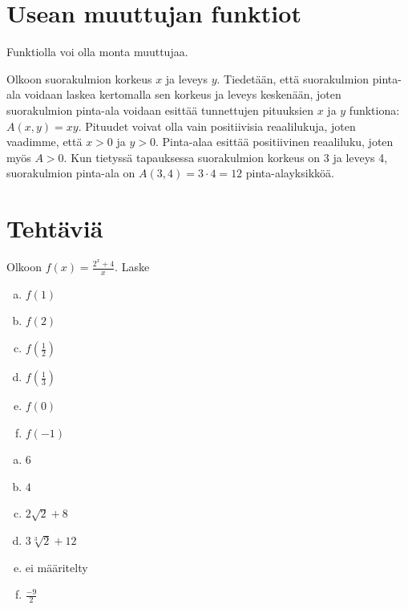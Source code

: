 \section{Usean muuttujan funktiot}

Funktiolla voi olla monta muuttujaa. 


\begin{esimerkki}
Olkoon suorakulmion korkeus $x$ ja leveys $y$. Tiedetään, että suorakulmion pinta-ala voidaan laskea kertomalla sen korkeus ja leveys keskenään, joten suorakulmion pinta-ala voidaan esittää tunnettujen pituuksien $x$ ja $y$ funktiona: $A(x,y)=xy$. Pituudet voivat olla vain positiivisia reaalilukuja, joten vaadimme, että $x>0$ ja $y>0$. Pinta-alaa esittää positiivinen reaaliluku, joten myös $A>0$. Kun tietyssä tapauksessa suorakulmion korkeus on 3 ja leveys 4, suorakulmion pinta-ala on $A(3,4)=3\cdot 4=12$ pinta-alayksikköä.
\end{esimerkki}

\section*{Tehtäviä}
\begin{tehtava}
Olkoon $f(x)=\frac{2^x+4}{x}$. Laske
\begin{enumerate}[a)]
\item $f(1)$
\item $f(2)$
\item $f(\frac{1}{2})$
\item $f(\frac{1}{3})$
\item $f(0)$
\item $f(-1)$
\end{enumerate}
\begin{vastaus}
\begin{enumerate}[a)]
\item $6$
\item $4$
\item $2\sqrt{2}+8$
\item $3\sqrt[3]{2}+12$
\item ei määritelty
\item $\frac{-9}{2}$
\end{enumerate}
\end{vastaus}
\end{tehtava}

